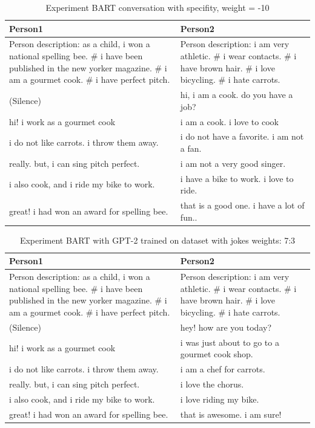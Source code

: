 \begin{table}[ht]
\centering
 \begin{tabular}{|p{7cm}|p{7cm}|} 
 \hline\hline
 \textbf{Person1} & \textbf{Person2} \\
 \hline\hline
 Person description: as a child, i won a national spelling bee. \# i have been published in the new yorker magazine. \# i am a gourmet cook. \# i have perfect pitch. & Person description: i am very athletic. \# i wear contacts. \# i have brown hair. \# i love bicycling. \# i hate carrots. \\
 \hline
 (Silence) & hi, i am a cook. do you have a job? \\ 
 \hline
 hi! i work as a gourmet cook & i am a cook. i love to cook \\
 \hline
 i do not like carrots. i throw them away. & i do not have a favorite. i am not a fan. \\
 \hline 
 really. but, i can sing pitch perfect. & i am not a very good singer. \\
 \hline
 i also cook, and i ride my bike to work. & i have a bike to work. i love to ride. \\
 \hline 
 great! i had won an award for spelling bee. & that is a good one. i have a lot of fun.. \\
 \hline\hline
 \end{tabular}
 \caption{Experiment BART conversation with specifity, weight = -10}
\label{tab:bart_conversation_idf-10_ap}
\end{table}

\begin{table}[ht]
\centering
 \begin{tabular}{|p{7cm}|p{7cm}|} 
 \hline\hline
 \textbf{Person1} & \textbf{Person2} \\
 \hline\hline
 Person description: as a child, i won a national spelling bee. \# i have been published in the new yorker magazine. \# i am a gourmet cook. \# i have perfect pitch. & Person description: i am very athletic. \# i wear contacts. \# i have brown hair. \# i love bicycling. \# i hate carrots. \\
 \hline
 (Silence) & hey! how are you today? \\ 
 \hline
 hi! i work as a gourmet cook & i was just about to go to a gourmet cook shop. \\
 \hline
 i do not like carrots. i throw them away. & i am a chef for carrots.\\
 \hline 
 really. but, i can sing pitch perfect. & i love the chorus. \\
 \hline
 i also cook, and i ride my bike to work. & i love riding my bike. \\
 \hline 
 great! i had won an award for spelling bee. & that is awesome. i am sure! \\
 \hline\hline
 \end{tabular}
 \caption{Experiment BART with GPT-2 trained on dataset with jokes weights: 7:3}
\label{tab:bart_conversation_gpt2_ap}
\end{table}

